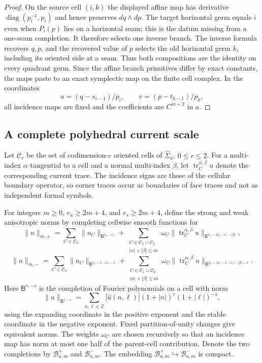 \begin{proof}
On the source cell $(i,k)$ the displayed affine map has derivative
$\operatorname{diag}(p_i^{-1},p_i)$ and hence preserves $dq\wedge dp$.
The target horizontal germ equals $i$ even when $P_i(p)$ lies on a horizontal
seam; this is the datum missing from a one-seam completion.  It therefore
selects one inverse branch.  The inverse formula recovers $q,p$, and the
recovered value of $p$ selects the old horizontal germ $k$, including its
oriented side at a seam.  Thus both compositions are the identity on every
quadrant germ.  Since the affine branch primitives differ by exact constants,
the maps paste to an exact symplectic map on the finite cell complex.  In the
coordinates
\[
 u=(q-s_{i-1})/p_i,
 \qquad v=(p-t_{k-1})/p_k,
\]
all incidence maps are fixed and the coefficients are $C^{m+2}$ in $a$.
\end{proof}

\subsection{A complete polyhedral current scale}

Let $\mathcal C_r$ be the set of codimension-$r$ oriented cells of
$\widehat\Sigma_a$, $0\le r\le2$.  For a multi-index $\alpha$ tangential to a
cell and a normal multi-index $\beta$, let
$\operatorname{tr}_{C}^{\alpha,\beta}u$ denote the corresponding current
trace.  The incidence signs are those of the cellular boundary operator, so
corner traces occur as boundaries of face traces and not as independent
formal symbols.

For integers $m\ge0$, $r_u\ge2m+4$, and $r_s\ge2m+4$, define the strong and
weak anisotropic norms by completing cellwise smooth functions for
\[
 \|u\|_{m,+}=
 \sum_{C\in\mathcal C_0}\|u_C\|_{\mathsf B^{r_u,-r_s}}
 +\sum_{\substack{C\in\mathcal C_1\cup\mathcal C_2\\
                   |\alpha|+|\beta|\le m}}
  \omega_C\|\operatorname{tr}_{C}^{\alpha,\beta}u\|_{
  \mathsf B^{r_u-|\alpha|,-r_s-|\beta|}},
\]
\[
 \|u\|_{m,-}=
 \sum_{C\in\mathcal C_0}\|u_C\|_{\mathsf B^{r_u-1,-r_s-1}}
 +\sum_{\substack{C\in\mathcal C_1\cup\mathcal C_2\\
                   |\alpha|+|\beta|\le m}}
  \omega_C\|\operatorname{tr}_{C}^{\alpha,\beta}u\|_{
  \mathsf B^{r_u-|\alpha|-1,-r_s-|\beta|-1}}.
\]
Here $\mathsf B^{r,-s}$ is the completion of Fourier polynomials on a cell
with norm
\[
 \|u\|_{\mathsf B^{r,-s}}
 =\sum_{n,\ell\in\mathbb Z}
  |\widehat u(n,\ell)|(1+|n|)^r(1+|\ell|)^{-s},
\]
using the expanding coordinate in the positive exponent and the stable
coordinate in the negative exponent.  Fixed partition-of-unity changes give
equivalent norms.  The weights $\omega_C$ are chosen recursively so that an
incidence map has norm at most one half of the parent-cell contribution.
Denote the two completions by $\mathscr B_{a,m}^+$ and
$\mathscr B_{a,m}^-$.  The embedding
$\mathscr B_{a,m}^+\hookrightarrow\mathscr B_{a,m}^-$ is compact.


